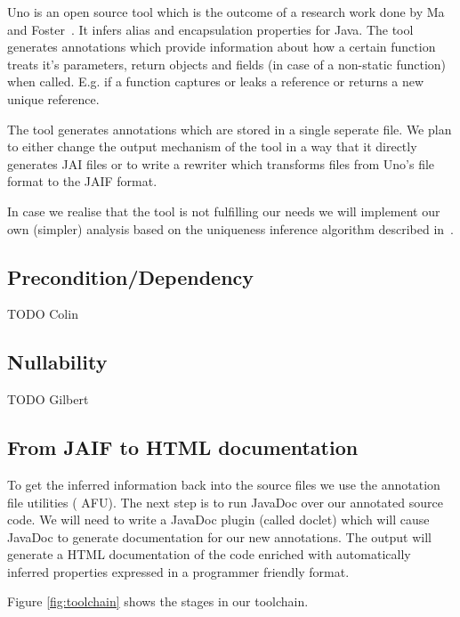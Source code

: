 Uno is an open source tool which is the outcome of a research work done by
Ma and Foster~\cite{Uno}. It infers alias and encapsulation properties for Java.
The tool generates annotations which provide information about how a certain function
treats it's parameters, return objects and fields (in case of a non-static function) 
when called. E.g. if a function captures or leaks a reference or returns a new 
unique reference.

The tool generates annotations which are stored in a single seperate file. We plan
to either change the output mechanism of the tool in a way that it directly generates
JAI files or to write a rewriter which transforms files from Uno's file format to the
JAIF format.

In case we realise that the tool is not fulfilling our needs we will implement
our own (simpler) analysis based on the uniqueness inference algorithm
described in~\cite{UniquenessInference}.

\subsection{Precondition/Dependency}

TODO Colin

\subsection{Nullability}
\label{sec:Nullability}
TODO Gilbert


\subsection{From JAIF to HTML documentation}
\label{sec:jaif2html}

To get the inferred information back into the source files we use the annotation 
file utilities (\cite{AFU} AFU). The next step is to run JavaDoc over our
annotated source code. We will need to write a JavaDoc plugin (called doclet) which will
cause JavaDoc to generate documentation for our new annotations. The output will
generate a HTML documentation of the code enriched with automatically inferred
properties expressed in a programmer friendly format.

Figure \ref{fig:toolchain} shows the stages in our toolchain.